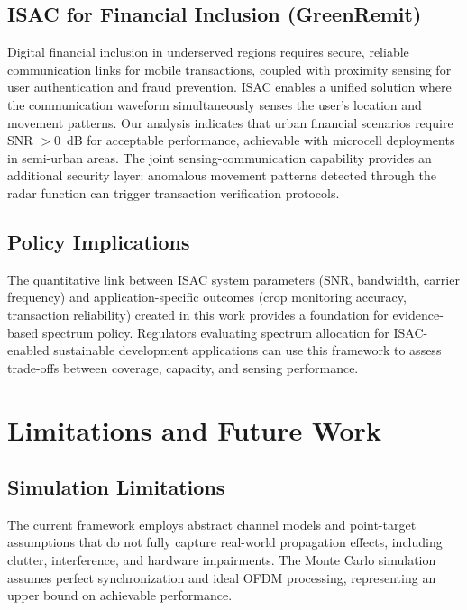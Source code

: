 \documentclass[conference]{IEEEtran}
\begin{document}
\subsection{ISAC for Financial Inclusion (GreenRemit)}

Digital financial inclusion in underserved regions requires secure, reliable communication links for mobile transactions, coupled with proximity sensing for user authentication and fraud prevention. ISAC enables a unified solution where the communication waveform simultaneously senses the user's location and movement patterns. Our analysis indicates that urban financial scenarios require SNR $>0$~dB for acceptable performance, achievable with microcell deployments in semi-urban areas. The joint sensing-communication capability provides an additional security layer: anomalous movement patterns detected through the radar function can trigger transaction verification protocols.

\subsection{Policy Implications}

The quantitative link between ISAC system parameters (SNR, bandwidth, carrier frequency) and application-specific outcomes (crop monitoring accuracy, transaction reliability) created in this work provides a foundation for evidence-based spectrum policy. Regulators evaluating spectrum allocation for ISAC-enabled sustainable development applications can use this framework to assess trade-offs between coverage, capacity, and sensing performance.

\section{Limitations and Future Work}

\subsection{Simulation Limitations}

The current framework employs abstract channel models and point-target assumptions that do not fully capture real-world propagation effects, including clutter, interference, and hardware impairments. The Monte Carlo simulation assumes perfect synchronization and ideal OFDM processing, representing an upper bound on achievable performance.
\end{document}

